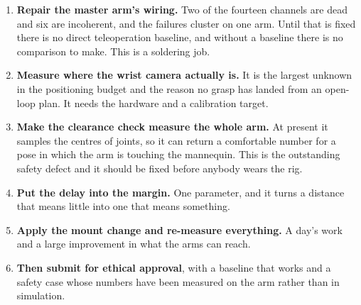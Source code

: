 \begin{enumerate}
  \item \textbf{Repair the master arm's wiring.} Two of the fourteen channels
    are dead and six are incoherent, and the failures cluster on one arm. Until
    that is fixed there is no direct teleoperation baseline, and without a
    baseline there is no comparison to make. This is a soldering job.
  \item \textbf{Measure where the wrist camera actually is.} It is the largest
    unknown in the positioning budget and the reason no grasp has landed from
    an open-loop plan. It needs the hardware and a calibration target.
  \item \textbf{Make the clearance check measure the whole arm.} At present it
    samples the centres of joints, so it can return a comfortable number for a
    pose in which the arm is touching the mannequin. This is the outstanding
    safety defect and it should be fixed before anybody wears the rig.
  \item \textbf{Put the delay into the margin.} One parameter, and it turns a
    distance that means little into one that means something.
  \item \textbf{Apply the mount change and re-measure everything.} A day's work
    and a large improvement in what the arms can reach.
  \item \textbf{Then submit for ethical approval}, with a baseline that works
    and a safety case whose numbers have been measured on the arm rather than
    in simulation.
\end{enumerate}
